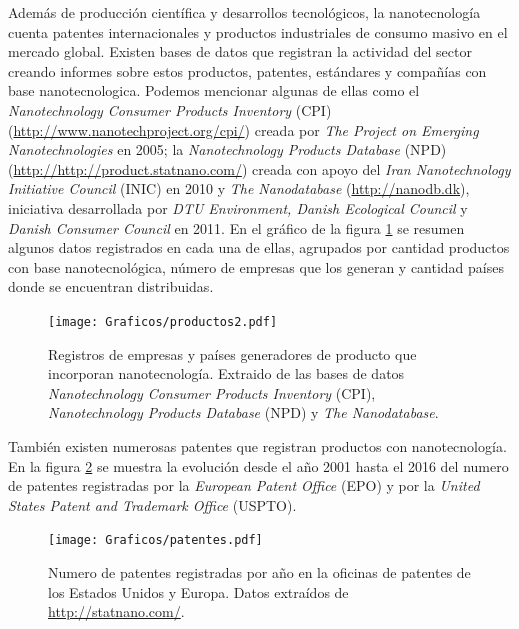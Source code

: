 	Además de producción científica y desarrollos tecnológicos, la nanotecnología cuenta patentes internacionales y productos industriales de consumo masivo en el mercado global. Existen bases de datos que registran la actividad del sector creando informes sobre estos productos, patentes, estándares y compañías con base nanotecnologica. Podemos mencionar algunas de ellas como el \textit{Nanotechnology Consumer Products Inventory} (CPI) (\url{http://www.nanotechproject.org/cpi/}) creada por \textit{The Project on Emerging Nanotechnologies} en 2005\cite{Vance2015}; la \textit{Nanotechnology Products Database} (NPD) (\url{http://http://product.statnano.com/}) creada con apoyo del \textit{Iran Nanotechnology Initiative Council} (INIC) en 2010 y \textit{The Nanodatabase} (\url{http://nanodb.dk}), iniciativa desarrollada por \textit{DTU Environment, Danish Ecological Council} y \textit{Danish Consumer Council} en 2011. En el gráfico de la figura \ref{fig:productos} se resumen algunos datos registrados en cada una de ellas, agrupados por cantidad productos con base nanotecnológica, número de empresas que los generan y cantidad países donde se encuentran distribuidas.

		\begin{figure}[ht!]
 			\begin{center}
 			\texttt{[image: Graficos/productos2.pdf]}
 			\caption[Cantidad de productos, compañías y origen con base nanotecnologica]{Registros de empresas y países generadores de producto que incorporan nanotecnología. Extraido de las bases de datos \textit{Nanotechnology Consumer Products Inventory} (CPI), \textit{Nanotechnology Products Database} (NPD) y \textit{The Nanodatabase}.}
 			\label{fig:productos}
 		    \end{center}
 		    \end{figure}

 	También existen numerosas patentes que registran productos con nanotecnología. En la figura \ref{fig:patentes} se muestra la evolución desde el año 2001 hasta el 2016 del numero de patentes registradas por la \textit{European Patent Office} (EPO) y por la \textit{United States Patent and Trademark Office} (USPTO).

		\begin{figure}[ht!]
 			\begin{center}
 			\texttt{[image: Graficos/patentes.pdf]}
 			\caption[Número de patentes de productos en base nanotecnologica]{Numero de patentes registradas por año en la oficinas de patentes de los Estados Unidos y Europa. Datos extraídos de \url{http://statnano.com/}.}
 			\label{fig:patentes}
 		    \end{center}
 		    \end{figure}

